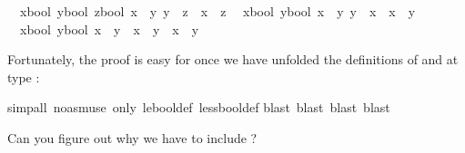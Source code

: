 \begin{isabellebody}
\begin{isamarkuptxt}
\begin{isabelle}
\ {}{\isachardot}\ {\isasymAnd}{\isacharparenleft}x{\isasymColon}bool{\isacharparenright}\ {\isacharparenleft}y{\isasymColon}bool{\isacharparenright}\ z{\isasymColon}bool{\isachardot}\ {\isasymlbrakk}x\ {\isacharless}{\isacharless}{\isacharequal}\ y{\isacharsemicolon}\ y\ {\isacharless}{\isacharless}{\isacharequal}\ z{\isasymrbrakk}\ {\isasymLongrightarrow}\ x\ {\isacharless}{\isacharless}{\isacharequal}\ z\isanewline
\ {}{\isachardot}\ {\isasymAnd}{\isacharparenleft}x{\isasymColon}bool{\isacharparenright}\ y{\isasymColon}bool{\isachardot}\ {\isasymlbrakk}x\ {\isacharless}{\isacharless}{\isacharequal}\ y{\isacharsemicolon}\ y\ {\isacharless}{\isacharless}{\isacharequal}\ x{\isasymrbrakk}\ {\isasymLongrightarrow}\ x\ {\isacharequal}\ y\isanewline
\ {}{\isachardot}\ {\isasymAnd}{\isacharparenleft}x{\isasymColon}bool{\isacharparenright}\ y{\isasymColon}bool{\isachardot}\ {\isacharparenleft}x\ {\isacharless}{\isacharless}\ y{\isacharparenright}\ {\isacharequal}\ {\isacharparenleft}x\ {\isacharless}{\isacharless}{\isacharequal}\ y\ {\isasymand}\ x\ {\isasymnoteq}\ y{\isacharparenright}%
\end{isabelle}
Fortunately, the proof is easy for 
once we have unfolded the definitions
of \isa{{\isacharless}{\isacharless}} and \isa{{\isacharless}{\isacharless}{\isacharequal}} at type :%
\end{isamarkuptxt}%
\isamarkuptrue%
simp{\isacharunderscore}all\ {\isacharparenleft}no{\isacharunderscore}asm{\isacharunderscore}use{\isacharparenright}\ only{\isacharcolon}\ le{\isacharunderscore}bool{\isacharunderscore}def\ less{\isacharunderscore}bool{\isacharunderscore}def{\isacharparenright}\isanewline
\isamarkupfalse%
blast{\isacharcomma}\ blast{\isacharcomma}\ blast{\isacharcomma}\ blast{\isacharparenright}\isamarkupfalse%
%
\begin{isamarkuptext}%
\noindent
Can you figure out why we have to include ?


\end{isamarkuptext}
\end{isabellebody}
